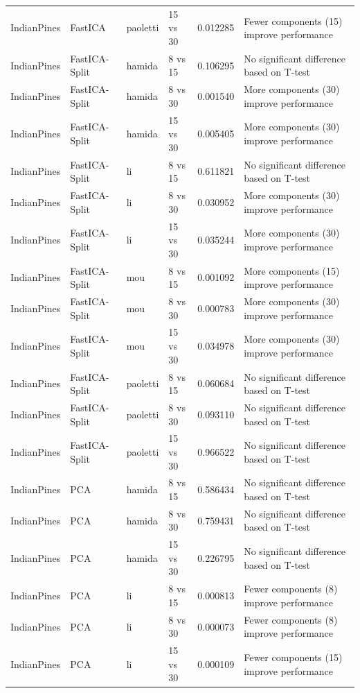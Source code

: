 \begin{longtable}{llllrl}
IndianPines & FastICA & paoletti & 15 vs 30 & 0.012285 & Fewer components (15) improve performance \\
IndianPines & FastICA-Split & hamida & 8 vs 15 & 0.106295 & No significant difference based on T-test \\
IndianPines & FastICA-Split & hamida & 8 vs 30 & 0.001540 & More components (30) improve performance \\
IndianPines & FastICA-Split & hamida & 15 vs 30 & 0.005405 & More components (30) improve performance \\
IndianPines & FastICA-Split & li & 8 vs 15 & 0.611821 & No significant difference based on T-test \\
IndianPines & FastICA-Split & li & 8 vs 30 & 0.030952 & More components (30) improve performance \\
IndianPines & FastICA-Split & li & 15 vs 30 & 0.035244 & More components (30) improve performance \\
IndianPines & FastICA-Split & mou & 8 vs 15 & 0.001092 & More components (15) improve performance \\
IndianPines & FastICA-Split & mou & 8 vs 30 & 0.000783 & More components (30) improve performance \\
IndianPines & FastICA-Split & mou & 15 vs 30 & 0.034978 & More components (30) improve performance \\
IndianPines & FastICA-Split & paoletti & 8 vs 15 & 0.060684 & No significant difference based on T-test \\
IndianPines & FastICA-Split & paoletti & 8 vs 30 & 0.093110 & No significant difference based on T-test \\
IndianPines & FastICA-Split & paoletti & 15 vs 30 & 0.966522 & No significant difference based on T-test \\
IndianPines & PCA & hamida & 8 vs 15 & 0.586434 & No significant difference based on T-test \\
IndianPines & PCA & hamida & 8 vs 30 & 0.759431 & No significant difference based on T-test \\
IndianPines & PCA & hamida & 15 vs 30 & 0.226795 & No significant difference based on T-test \\
IndianPines & PCA & li & 8 vs 15 & 0.000813 & Fewer components (8) improve performance \\
IndianPines & PCA & li & 8 vs 30 & 0.000073 & Fewer components (8) improve performance \\
IndianPines & PCA & li & 15 vs 30 & 0.000109 & Fewer components (15) improve performance \\

\end{longtable}
